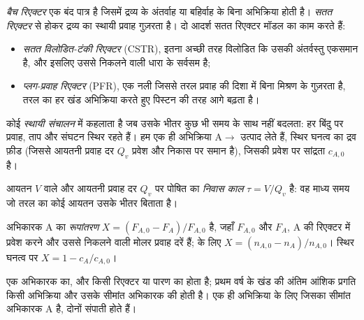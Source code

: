 \begin{definition}[रिएक्टर के प्रकार]\label{def:b2:continuous-reactors:reactors}
\emph{बैच रिएक्टर} एक बंद पात्र है जिसमें
द्रव्य के अंतर्वाह या बहिर्वाह के बिना अभिक्रिया होती है।
\emph{सतत रिएक्टर} से होकर द्रव्य का स्थायी
प्रवाह गुज़रता है। दो आदर्श सतत रिएक्टर मॉडल का काम करते हैं:
\begin{itemize}
  \item \emph{सतत विलोडित-टंकी रिएक्टर}
(CSTR), इतना अच्छी तरह विलोडित कि उसकी अंतर्वस्तु
        एकसमान है, और इसलिए उससे निकलने वाली धारा के सर्वसम है;
  \item \emph{प्लग-प्रवाह रिएक्टर} (PFR), एक नली
        जिससे तरल प्रवाह की दिशा में बिना मिश्रण के गुज़रता है, तरल का हर
        खंड अभिक्रिया करते हुए पिस्टन की तरह आगे बढ़ता है।
\end{itemize}
\end{definition}

कोई  \emph{स्थायी संचालन} में कहलाता है जब उसके भीतर
कुछ भी समय के साथ नहीं बदलता: हर बिंदु पर प्रवाह, ताप और
संघटन स्थिर रहते हैं। हम एक ही अभिक्रिया
$\mathrm A \to$ उत्पाद लेते हैं, स्थिर घनत्व का द्रव फ़ीड (जिससे
आयतनी प्रवाह दर $Q_v$ प्रवेश और निकास पर समान है), जिसकी प्रवेश पर
सांद्रता $c_{A,0}$ है।

\begin{definition}[निवास काल]\label{def:b2:continuous-reactors:residence-time}
आयतन $V$ वाले और आयतनी प्रवाह दर $Q_v$ पर पोषित  का
\emph{निवास काल} $\tau = V/Q_v$ है: वह माध्य
समय जो तरल का कोई आयतन उसके भीतर बिताता है।
\end{definition}

\begin{definition}[रूपांतरण]\label{def:b2:continuous-reactors:conversion}
अभिकारक A का \emph{रूपांतरण} $X = (F_{A,0} -
F_A)/F_{A,0}$ है, जहाँ $F_{A,0}$ और $F_A$, A की रिएक्टर में प्रवेश करने और
उससे निकलने वाली मोलर प्रवाह दरें हैं;  के लिए $X = (n_{A,0} -
n_A)/n_{A,0}$। स्थिर घनत्व पर $X = 1 - c_A/c_{A,0}$।
\end{definition}

 एक अभिकारक का, और किसी रिएक्टर या पारण का होता है; प्रथम वर्ष के खंड की
अंतिम आंशिक प्रगति किसी अभिक्रिया और उसके सीमांत अभिकारक की होती है।
एक ही अभिक्रिया के लिए जिसका सीमांत अभिकारक A है, दोनों
संपाती होते हैं।


